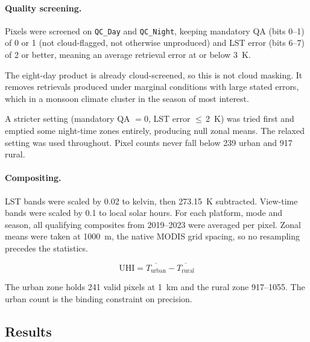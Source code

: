 \documentclass[11pt,a4paper]{article}
\begin{document}
\paragraph{Quality screening.}
\label{sec:qc}

Pixels were screened on \texttt{QC\_Day} and \texttt{QC\_Night}, keeping
mandatory QA (bits 0--1) of 0 or 1 (not cloud-flagged, not otherwise
unproduced) and LST error (bits 6--7) of 2 or better, meaning an
average retrieval error at or below \SI{3}{\kelvin}.

The eight-day product is already cloud-screened, so this is not cloud
masking. It removes retrievals produced under marginal conditions with
large stated errors, which in a monsoon climate cluster in the season
of most interest.

A stricter setting (mandatory QA $=0$, LST error
$\leq\,$\SI{2}{\kelvin}) was tried first and emptied some night-time
zones entirely, producing null zonal means. The relaxed setting was
used throughout. Pixel counts never fall below 239 urban and 917
rural.

\paragraph{Compositing.}
LST bands were scaled by \num{0.02} to kelvin, then
\SI{273.15}{\kelvin} subtracted. View-time bands were scaled by
\num{0.1} to local solar hours. For each platform, mode and season,
all qualifying composites from 2019--2023 were averaged per pixel.
Zonal means were taken at \SI{1000}{\metre}, the native MODIS grid
spacing, so no resampling precedes the statistics.

\begin{equation}
  \mathrm{UHI} = \overline{T_{\mathrm{urban}}} - \overline{T_{\mathrm{rural}}}
\end{equation}

The urban zone holds 241 valid pixels at \SI{1}{\kilo\metre} and the
rural zone 917--1055. The urban count is the binding constraint on
precision.

\subsection{Results}
\end{document}

